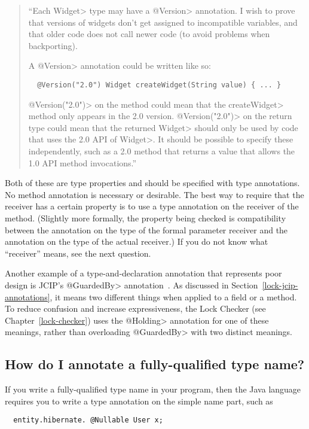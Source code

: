\begin{quote}
  ``Each \<Widget> type may have a \<@Version> annotation.
  I wish to prove that versions of widgets don't get assigned to
  incompatible variables, and that older code does not call newer code (to
  avoid problems when backporting).

  A \<@Version> annotation could be written like so:

\begin{Verbatim}
  @Version("2.0") Widget createWidget(String value) { ... }
\end{Verbatim}

\<@Version("2.0")> on the method could mean that the \<createWidget> method
only appears in the 2.0 version.  \<@Version("2.0")> on the return type
could mean that the returned \<Widget> should only be used by code that
uses the 2.0 API of \<Widget>.  It should be possible to specify these
independently, such as a 2.0 method that returns a value that allows the
1.0 API method invocations.''
\end{quote}

Both of these are type properties and should be specified with type
annotations.  No method annotation is necessary or desirable.  The best way
to require that the receiver has a certain property is to use a type
annotation on the receiver of the method.  (Slightly more formally, the
property being checked is compatibility between the annotation on the type
of the formal parameter receiver and the annotation on the type of the
actual receiver.)  If you do not know what ``receiver'' means, see the next
question.


Another example of a type-and-declaration annotation that represents poor
design is JCIP's \<@GuardedBy> annotation~\cite{Goetz2006}.  As discussed
in Section~\ref{lock-jcip-annotations}, it means two different things when
applied to a field or a method.  To reduce confusion and increase
expressiveness, the Lock Checker (see Chapter~\ref{lock-checker}) uses the
\<@Holding> annotation for one of these meanings, rather than overloading
\<@GuardedBy> with two distinct meanings.


\subsection{How do I annotate a fully-qualified type name?\label{faq-annotate-fully-qualified-name}}

If you write a fully-qualified type name in your program, then the Java
language requires you to write a type annotation on the simple name part,
such as
\begin{Verbatim}
  entity.hibernate. @Nullable User x;
\end{Verbatim}

